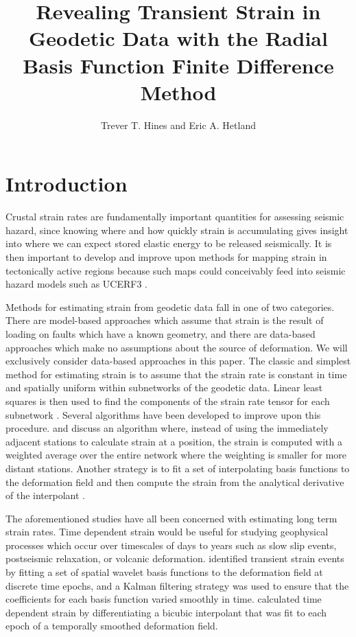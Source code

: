 \documentclass[10pt,a4paper]{article}
\title{Revealing Transient Strain in Geodetic Data with the Radial Basis Function Finite Difference Method}
\author{Trever T. Hines and Eric A. Hetland}
\begin{document}
\maketitle


\section{Introduction}\label{sec:Introduction}

Crustal strain rates are fundamentally important quantities for assessing seismic hazard, since knowing where and how quickly strain is accumulating gives insight into where we can expect stored elastic energy to be released seismically.  It is then important to develop and improve upon methods for mapping strain in tectonically active regions because such maps could conceivably feed into seismic hazard models such as UCERF3 \citep{Field2014}. 

Methods for estimating strain from geodetic data fall in one of two categories.  There are model-based approaches which assume that strain is the result of loading on faults which have a known geometry, and there are data-based approaches which make no assumptions about the source of deformation.  We will exclusively consider data-based approaches in this paper.  The classic and simplest method for estimating strain is to assume that the strain rate is constant in time and spatially uniform within subnetworks of the geodetic data.  Linear least squares is then used to find the components of the strain rate tensor for each subnetwork \citep[e.g][]{Frank1966,Prescott1976,Savage1986,Feigl1990,Murray2000}. Several algorithms have been developed to improve upon this procedure. \citet{Shen1996} and \citet{Shen2015} discuss an algorithm where, instead of using the immediately adjacent stations to calculate strain at a position, the strain is computed with a weighted average over the entire network where the weighting is smaller for more distant stations.  Another strategy is to fit a set of interpolating basis functions to the deformation field and then compute the strain from the analytical derivative of the interpolant \citep[e.g.][]{Beavan2001,Tape2009,Sandwell2016}.  

The aforementioned studies have all been concerned with estimating long term strain rates. Time dependent strain would be useful for studying geophysical processes which occur over timescales of days to years such as slow slip events, postseismic relaxation, or volcanic deformation.  \citet{Ohtani2010} identified transient strain events by fitting a set of spatial wavelet basis functions to the deformation field at discrete time epochs, and a Kalman filtering strategy was used to ensure that the coefficients for each basis function varied smoothly in time. \citet{Holt2013} calculated time dependent strain by differentiating a bicubic interpolant that was fit to each epoch of a temporally smoothed deformation field. 
\end{document}
